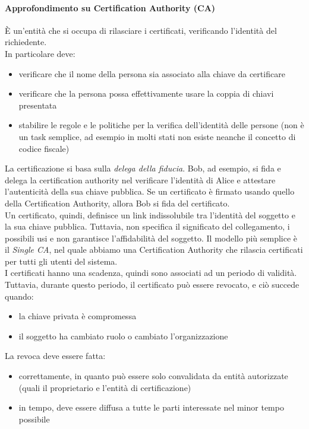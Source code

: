 \documentclass[a4paper,12pt]{article}
\begin{document}
\paragraph{Approfondimento su Certification Authority (CA)} È un'entità che si occupa di rilasciare i certificati, verificando l'identità del richiedente. \\
In particolare deve:
\begin{itemize}
	\item verificare che il nome della persona sia associato alla chiave da certificare
	\item verificare che la persona possa effettivamente usare la coppia di chiavi presentata
	\item stabilire le regole e le politiche per la verifica dell'identità delle persone (non è un task semplice, ad esempio in molti stati non esiste neanche il concetto di codice fiscale)
\end{itemize}
La certificazione si basa sulla \textit{delega della fiducia}. Bob, ad esempio, si fida e delega la certification authority nel verificare l'identità di Alice e attestare l'autenticità della sua chiave pubblica.
Se un certificato è firmato usando quello della Certification Authority, allora Bob si fida del certificato. \\
Un certificato, quindi, definisce un link indissolubile tra l'identità del soggetto e la sua chiave pubblica. Tuttavia, non specifica il significato del collegamento, i possibili usi e non garantisce l'affidabilità del soggetto.
Il modello più semplice è il \textit{Single CA}, nel quale abbiamo una Certification Authority che rilascia certificati per tutti gli utenti del sistema. \\
I certificati hanno una scadenza, quindi sono associati ad un periodo di validità. Tuttavia, durante questo periodo, il certificato può essere revocato, e ciò succede quando:
\begin{itemize}
	\item la chiave privata è compromessa
	\item il soggetto ha cambiato ruolo o cambiato l'organizzazione
\end{itemize}
La revoca deve essere fatta:
\begin{itemize}
	\item correttamente, in quanto può essere solo convalidata da entità autorizzate (quali il proprietario e l'entità di certificazione)
	\item in tempo, deve essere diffusa a tutte le parti interessate nel minor tempo possibile
\end{itemize}
\end{document}
